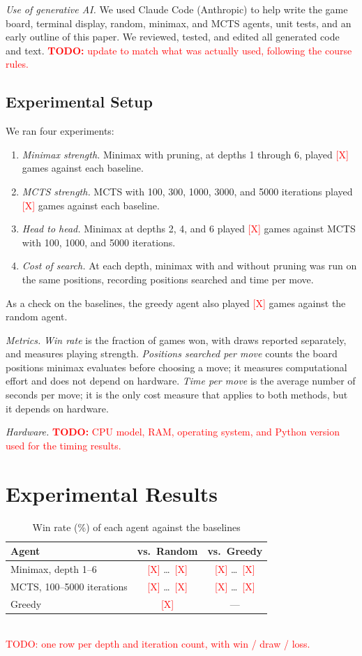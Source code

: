 \documentclass[10pt,twocolumn,letterpaper]{article}
\newcommand{\todo}[1]{\textcolor{red}{\textbf{TODO:} #1}}
\newcommand{\X}{\textcolor{red}{[X]}}
\begin{document}
\textit{Use of generative AI.} We used Claude Code (Anthropic) to help write the game board,
terminal display, random, minimax, and MCTS agents, unit tests, and an early outline of this
paper. We reviewed, tested, and edited all generated code and text. \todo{update to match
what was actually used, following the course rules.}

\subsection{Experimental Setup}

We ran four experiments:
\begin{enumerate}[leftmargin=*,nosep]
  \item \emph{Minimax strength.} Minimax with pruning, at depths 1 through 6, played \X{}
        games against each baseline.
  \item \emph{MCTS strength.} MCTS with 100, 300, 1000, 3000, and 5000 iterations played
        \X{} games against each baseline.
  \item \emph{Head to head.} Minimax at depths 2, 4, and 6 played \X{} games against MCTS
        with 100, 1000, and 5000 iterations.
  \item \emph{Cost of search.} At each depth, minimax with and without pruning was run on
        the same positions, recording positions searched and time per move.
\end{enumerate}
As a check on the baselines, the greedy agent also played \X{} games against the random
agent.

\textit{Metrics.} \emph{Win rate} is the fraction of games won, with draws reported
separately, and measures playing strength. \emph{Positions searched per move} counts the
board positions minimax evaluates before choosing a move; it measures computational effort
and does not depend on hardware. \emph{Time per move} is the average number of seconds per
move; it is the only cost measure that applies to both methods, but it depends on hardware.

\textit{Hardware.} \todo{CPU model, RAM, operating system, and Python version used for the
timing results.}

\section{Experimental Results}

\begin{table}[t]
\caption{Win rate (\%) of each agent against the baselines}
\label{tab:baselines}
\centering\footnotesize
\begin{tabular}{lcc}
\toprule
Agent & vs.\ Random & vs.\ Greedy \\
\midrule
Minimax, depth 1--6 & \X{} \ldots\ \X{} & \X{} \ldots\ \X{} \\
MCTS, 100--5000 iterations & \X{} \ldots\ \X{} & \X{} \ldots\ \X{} \\
Greedy & \X{} & --- \\
\bottomrule
\end{tabular}
\\[2pt]\textcolor{red}{\footnotesize TODO: one row per depth and iteration count, with
win / draw / loss.}
\end{table}
\end{document}
